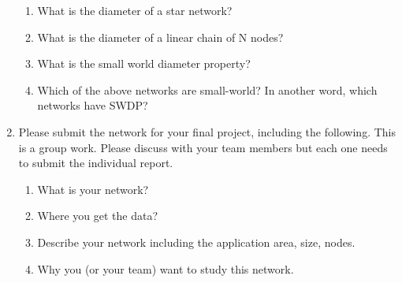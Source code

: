 \documentclass{amsart}
\theoremstyle{definition}
\theoremstyle{remark}
\numberwithin{equation}{section}
\begin{document}
\begin{enumerate}
\begin{enumerate}
\item What is the diameter of a star network? \vspace{1cm}



\item What is the diameter of a linear chain of N nodes? \vspace{1cm}



\item What is the small world diameter property? \vspace{1cm}



\item Which of the above networks are small-world? In another word, which networks have SWDP?



\end{enumerate}

\clearpage
\item Please submit the network for your final project, including the following. This is a group work. Please discuss with your team members but each one needs to submit the individual report. 
\begin{enumerate}
\item What is your network? \vspace{1cm}



\item Where you get the data? \vspace{1cm}



\item Describe your network including the application area, size, nodes. \vspace{1cm}



\item Why you (or your team) want to study this network. 



\end{enumerate}

\end{enumerate}
\end{document}
